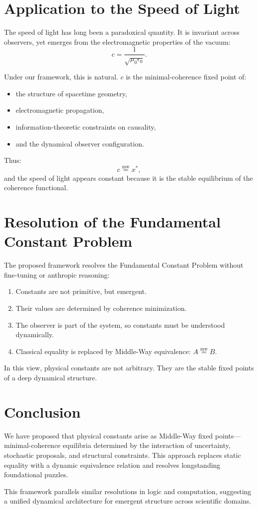 \documentclass[11pt]{article}
\newcommand{\mweq}{\mathrel{\overset{\mathrm{mw}}{=}}}
\begin{document}
\section{Application to the Speed of Light}

The speed of light has long been a paradoxical quantity.
It is invariant across observers, yet emerges from the electromagnetic
properties of the vacuum:
\[
c = \frac{1}{\sqrt{\mu_{0} \epsilon_{0}}}.
\]

Under our framework, this is natural. $c$ is the minimal-coherence
fixed point of:

\begin{itemize}
    \item the structure of spacetime geometry,
    \item electromagnetic propagation,
    \item information-theoretic constraints on causality,
    \item and the dynamical observer configuration.
\end{itemize}

Thus:
\[
 c \mweq x^{\ast},
\]
and the speed of light appears constant because it is
the stable equilibrium of the coherence functional.

\section{Resolution of the Fundamental Constant Problem}

The proposed framework resolves the Fundamental Constant Problem
without fine-tuning or anthropic reasoning:

\begin{enumerate}
    \item Constants are not primitive, but emergent.
    \item Their values are determined by coherence minimization.
    \item The observer is part of the system, so constants
    must be understood dynamically.
    \item Classical equality is replaced by Middle-Way
    equivalence: $A \mweq B$.
\end{enumerate}

In this view, physical constants are not arbitrary.
They are the stable fixed points of a deep dynamical structure.

\section{Conclusion}

We have proposed that physical constants arise as Middle-Way fixed
points---minimal-coherence equilibria determined by the interaction
of uncertainty, stochastic proposals, and structural constraints.
This approach replaces static equality with a dynamic equivalence
relation and resolves longstanding foundational puzzles.

This framework parallels similar resolutions in logic and
computation, suggesting a unified dynamical architecture for
emergent structure across scientific domains.



\end{document}
